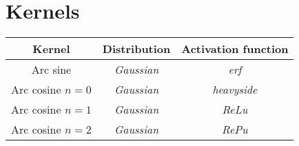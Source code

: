 






\section{Kernels}
\label{sec:kernels}

\begin{table}[H]
    \begin{tabular}{ccc}
        \toprule
        \textbf{Kernel} & \textbf{Distribution} & \textbf{Activation function} \\
        \midrule
        Arc sine & \textit{Gaussian} & \textit{erf} \\
        Arc cosine $n=0$ & \textit{Gaussian} & \textit{heavyside} \\
        Arc cosine $n=1$ & \textit{Gaussian} & \textit{ReLu} \\
        Arc cosine $n=2$ & \textit{Gaussian} & \textit{RePu} \\
        \bottomrule
    \end{tabular}
\end{table}

